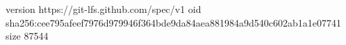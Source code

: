 version https://git-lfs.github.com/spec/v1
oid sha256:cee795afeef7976d979946f364bde9da84aea881984a9d540c602ab1a1e07741
size 87544
